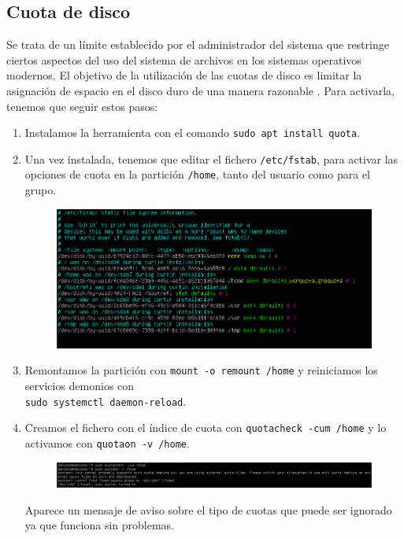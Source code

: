 \documentclass[10pt]{article}
\begin{document}
	\subsection{Cuota de disco}
	Se trata de un límite establecido por el administrador del sistema que restringe ciertos aspectos del uso del sistema de archivos en los sistemas operativos modernos. El objetivo de la utilización de las cuotas de disco es limitar la asignación de espacio en el disco duro de una manera razonable \cite{quota}. Para activarla, tenemos que seguir estos pasos\cite{disk_quota}:
	\begin{enumerate}
		\item Instalamos la herramienta con el comando \verb|sudo apt install quota|.
		\item Una vez instalada, tenemos que editar el fichero \verb|/etc/fstab|, para activar las opciones de cuota en la partición \verb|/home|, tanto del usuario como para el grupo.
		\begin{figure}[H]
			\setlength{\abovecaptionskip}{0cm}
			\setlength{\belowcaptionskip}{0cm}
			\centering
			\includegraphics[width=0.7\linewidth]{Recursos/fstabQuota.png}
		\end{figure}
		\item Remontamos la partición con \verb|mount -o remount /home| y reiniciamos los servicios demonios con \\ \verb|sudo systemctl daemon-reload|.
		\item Creamos el fichero con el índice de cuota con \verb|quotacheck -cum /home| y lo activamos con \verb|quotaon -v /home|.
		\begin{figure}[H]
			\setlength{\abovecaptionskip}{0cm}
			\setlength{\belowcaptionskip}{0cm}
			\centering
			\includegraphics[width=0.9\linewidth]{Recursos/quotaOn.png}
		\end{figure}
		Aparece un mensaje de aviso sobre el tipo de cuotas que puede ser ignorado ya que funciona sin problemas.

\end{enumerate}
\end{document}
